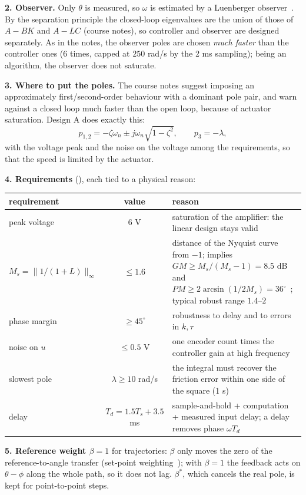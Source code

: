 \documentclass[10pt,a4paper]{article}
\newcommand{\code}[1]{\texttt{\detokenize{#1}}}
\begin{document}
\textbf{2. Observer.} Only $\theta$ is measured, so $\omega$ is estimated by a Luenberger observer~\cite{luenberger71}. By the
separation principle the closed-loop eigenvalues are the union of those of $A-BK$ and $A-LC$ (course notes), so controller and
observer are designed separately. As in the notes, the observer poles are chosen \emph{much faster} than the controller ones
(6 times, capped at $250$ rad/s by the 2 ms sampling); being an algorithm, the observer does not saturate.

\textbf{3. Where to put the poles.} The course notes suggest imposing an approximately first/second-order behaviour with a
dominant pole pair, and warn against a closed loop much faster than the open loop, because of actuator saturation. Design A
does exactly this:
\begin{equation}
  p_{1,2}=-\zeta\omega_n\pm j\omega_n\sqrt{1-\zeta^2},\qquad p_3=-\lambda ,
\end{equation}
with the voltage peak and the noise on the voltage among the requirements, so that the speed is limited by the actuator.

\textbf{4. Requirements} (\code{pp_setup.m}), each tied to a physical reason:

\begin{tabularx}{\linewidth}{@{}l c X@{}}
\toprule
requirement & value & reason \\
\midrule
peak voltage & 6 V & saturation of the amplifier: the linear design stays valid \\
$M_s=\|1/(1+L)\|_\infty$ & $\leq1.6$ & distance of the Nyquist curve from $-1$; implies $GM\geq M_s/(M_s-1)=8.5$ dB and
  $PM\geq2\arcsin(1/2M_s)=36^\circ$~\cite{skogestad05}; typical robust range $1.4$--$2$~\cite{astrom06} \\
phase margin & $\geq45^\circ$ & robustness to delay and to errors in $k,\tau$ \\
noise on $u$ & $\leq0.5$ V & one encoder count times the controller gain at high frequency \\
slowest pole & $\lambda\geq10$ rad/s & the integral must recover the friction error within one side of the square (1 s) \\
delay & $T_d=1.5T_s+3.5$ ms & sample-and-hold + computation + measured input delay; a delay removes phase $\omega T_d$ \\
\bottomrule
\end{tabularx}

\textbf{5. Reference weight $\beta=1$} for trajectories: $\beta$ only moves the zero of the reference-to-angle transfer
(set-point weighting~\cite{astrom06}); with $\beta=1$ the feedback acts on $\theta-\phi$ along the whole path, so it does not lag.
$\beta^*$, which cancels the real pole, is kept for point-to-point steps.
\end{document}
